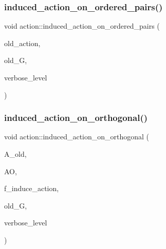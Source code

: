 \subsubsection{\texorpdfstring{induced\+\_\+action\+\_\+on\+\_\+ordered\+\_\+pairs()}{induced\_action\_on\_ordered\_pairs()}}
{\footnotesize\ttfamily void action\+::induced\+\_\+action\+\_\+on\+\_\+ordered\+\_\+pairs (\begin{DoxyParamCaption}\item[{\mbox{\hyperlink{classaction}{action}} \&}]{old\+\_\+action,  }\item[{\mbox{\hyperlink{classsims}{sims}} $\ast$}]{old\+\_\+G,  }\item[{\mbox{\hyperlink{galois_8h_a09fddde158a3a20bd2dcadb609de11dc}{I\+NT}}}]{verbose\+\_\+level }\end{DoxyParamCaption})}

\mbox{\label{classaction_a4f191cee643a81d7f18a4d729084e945}} 
\subsubsection{\texorpdfstring{induced\+\_\+action\+\_\+on\+\_\+orthogonal()}{induced\_action\_on\_orthogonal()}}
{\footnotesize\ttfamily void action\+::induced\+\_\+action\+\_\+on\+\_\+orthogonal (\begin{DoxyParamCaption}\item[{\mbox{\hyperlink{classaction}{action}} $\ast$}]{A\+\_\+old,  }\item[{\mbox{\hyperlink{classaction__on__orthogonal}{action\+\_\+on\+\_\+orthogonal}} $\ast$}]{AO,  }\item[{\mbox{\hyperlink{galois_8h_a09fddde158a3a20bd2dcadb609de11dc}{I\+NT}}}]{f\+\_\+induce\+\_\+action,  }\item[{\mbox{\hyperlink{classsims}{sims}} $\ast$}]{old\+\_\+G,  }\item[{\mbox{\hyperlink{galois_8h_a09fddde158a3a20bd2dcadb609de11dc}{I\+NT}}}]{verbose\+\_\+level }\end{DoxyParamCaption})}

\mbox{\label{classaction_a4b01c7b3cc749218e9dbd84b9fed90b3}} 
